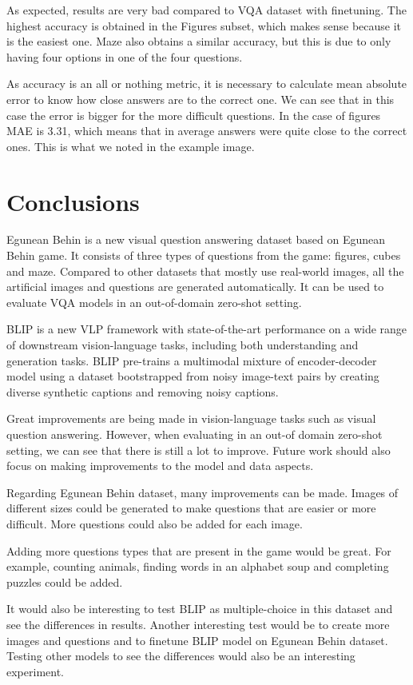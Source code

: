 \documentclass[11pt]{article}
\begin{document}
As expected, results are very bad compared to VQA dataset with finetuning. The highest accuracy is obtained in the Figures subset, which makes sense because it is the easiest one. Maze also obtains a similar accuracy, but this is due to only having four options in one of the four questions.

As accuracy is an all or nothing metric, it is necessary to calculate mean absolute error to know how close answers are to the correct one. We can see that in this case the error is bigger for the more difficult questions. In the case of figures MAE is 3.31, which means that in average answers were quite close to the correct ones. This is what we noted in the example image.

\section{Conclusions}

Egunean Behin is a new visual question answering dataset based on Egunean Behin game. It consists of three types of questions from the game: figures, cubes and maze. Compared to other datasets that mostly use real-world images, all the artificial images and questions are generated automatically. It can be used to evaluate VQA models in an out-of-domain zero-shot setting.

BLIP is a new VLP framework with state-of-the-art performance on a wide range of downstream vision-language tasks, including both understanding and generation tasks. BLIP pre-trains a multimodal mixture of encoder-decoder model using a dataset bootstrapped from noisy image-text pairs by creating diverse synthetic captions and removing noisy captions.

Great improvements are being made in vision-language tasks such as visual question answering. However, when evaluating in an out-of domain zero-shot setting, we can see that there is still a lot to improve. Future work should also focus on making improvements to the model and data aspects.

Regarding Egunean Behin dataset, many improvements can be made. Images of different sizes could be generated to make questions that are easier or more difficult. More questions could also be added for each image.

Adding more questions types that are present in the game would be great. For example, counting animals, finding words in an alphabet soup and completing puzzles could be added.

It would also be interesting to test BLIP as multiple-choice in this dataset and see the differences in results. Another interesting test would be to create more images and questions and to finetune BLIP model on Egunean Behin dataset. Testing other models to see the differences would also be an interesting experiment.



\end{document}
